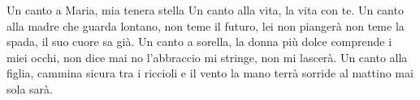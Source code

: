 \beginchorus
Un canto a Maria, mia tenera stella
Un canto alla vita, la vita con te.
\endchorus
\beginverse
Un canto alla madre che guarda lontano,
non teme il futuro, lei non piangerà
non teme la spada, il suo cuore sa già.
Un canto a sorella, la donna più dolce
comprende i miei occhi, non dice mai no
l'abbraccio mi stringe, non mi lascerà.
Un canto alla figlia, cammina sicura
tra i riccioli e il vento la mano terrà
sorride al mattino mai sola sarà.
\endverse
\endsong
